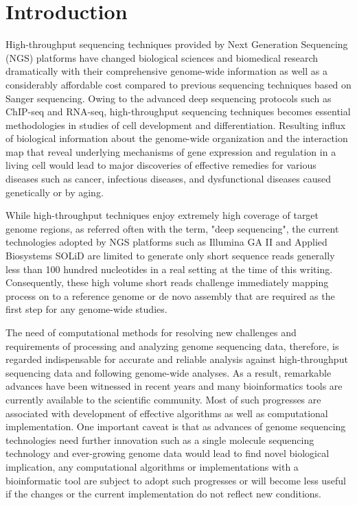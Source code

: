 \documentclass[12pt]{article}
\begin{document}
\section{Introduction}

% 
% 
High-throughput sequencing techniques provided by Next Generation Sequencing (NGS) platforms have changed biological
sciences and biomedical research dramatically with their comprehensive genome-wide
information as well as a considerably affordable cost compared to previous sequencing techniques based on Sanger sequencing\cite{metzker2010,mardis2008-tig,mardis2008-arghg,gilad2009,mortazavi2008,sorek2010}.  
Owing to the advanced deep sequencing protocols such as ChIP-seq and RNA-seq, high-throughput sequencing techniques becomes essential methodologies in studies   of cell development and differentiation\cite{wang2009-natrevgen,pepke2009,gilad2009,mortazavi2008,sorek2010}.   Resulting influx of biological information about the genome-wide organization and the interaction map that reveal underlying mechanisms of gene expression and regulation in a living cell would lead to major discoveries of effective remedies for various diseases such as cancer, infectious diseases, and dysfunctional diseases caused genetically or by aging\cite{amaral2008,encode2007,baek2008,costa2009,}.    

While high-throughput techniques enjoy extremely high coverage of target genome regions, as referred often with the term, "deep sequencing", the current technologies adopted by NGS platforms such as Illumina GA II and Applied Biosystems SOLiD are limited to generate only short sequence reads generally less than 100 hundred nucleotides in a real setting at the time of this writing.  Consequently, these high volume short reads challenge immediately mapping process on to a reference genome or de novo assembly that are required as the first step for any genome-wide studies\cite{alex2009,trapnell2009,scheibye-alsing2009,pop2002,hernandez2008,farrer2008}.      

The need of computational methods for resolving new challenges and requirements of processing and analyzing
genome sequencing data, therefore, is regarded indispensable for accurate and reliable analysis against high-throughput sequencing data and following genome-wide analyses.  As a result, remarkable advances have been witnessed in recent years and many bioinformatics tools are currently available to the scientific community.  Most of such progresses are associated with development of effective algorithms as well as computational implementation\cite{trapnell2009,bfast2009}.  One important caveat is that as advances of genome sequencing technologies need further innovation such as a single molecule sequencing technology and ever-growing genome data would lead to find novel biological implication, any computational algorithms or implementations with a bioinformatic tool are subject to adopt such progresses or will become less useful if the changes or the current implementation do not reflect new conditions. 
\end{document}
